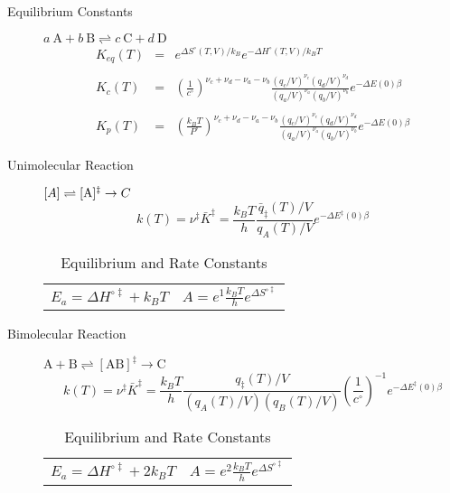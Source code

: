 \documentclass[11pt]{article}
\begin{document}
\begin{table}
\begin{center}
    \caption{\large{Equilibrium and Rate Constants}}
   \begin{description}
   \item[Equilibrium Constants] $a~\text{A} + b~\text{B} \rightleftharpoons c~\text{C} + d~\text{D} $
     \begin{eqnarray*}
       K_{eq}(T) &=& e^{\Delta S^\circ(T,V)/k_B}e^{-\Delta H^\circ(T,V)/k_BT}
       \\ \\
            K_c(T) &=&
           \left(\frac{1}{c^\circ}\right)^{\nu_c+\nu_d-\nu_a-\nu_b}\frac{(q_c/V)^{\nu_c}(q_d/V)^{\nu_d}}{(q_a/V)^{\nu_a}(q_b/V)^{\nu_b}}e^{-\Delta
            E(0)\beta}\\ \\
            K_p(T) &=&
          \left(\frac{k_BT}{P^\circ}\right)^{\nu_c+\nu_d-\nu_a-\nu_b}\frac{(q_c/V)^{\nu_c}(q_d/V)^{\nu_d}}{(q_a/V)^{\nu_a}(q_b/V)^{\nu_b}}e^{-\Delta
            E(0)\beta}
\end{eqnarray*}
\item[Unimolecular Reaction] $\text[A] \rightleftharpoons [\text{A} ]^\ddagger
  \rightarrow C$
      \begin{displaymath}
        k(T)=\nu^\ddagger \bar K^\ddagger=\frac{k_B T}{h} \frac{\bar{q}_\ddagger(T)/V}{q_A(T)/V}
          e^{-\Delta E^\ddagger(0)\beta}
      \end{displaymath}
\begin{center}
      \begin{tabular}{cc}
      $ \displaystyle E_a =\Delta H^{\circ\ddagger}+k_B T $
      & $ \displaystyle A = e^1\frac{k_B T}{h} e^{\Delta S^{\circ\ddagger}} $
      \end{tabular}
\end{center}
\item[Bimolecular Reaction] $
        \mathrm{A} + \mathrm{B} \rightleftharpoons [ \mathrm{AB}]^\ddagger
        \rightarrow \text{C}$
      \begin{displaymath}
        k(T)=\nu^\ddagger \bar K^\ddagger=\frac{k_B T}{h} \frac{q_\ddagger(T)/V}{(q_A(T)/V)(q_B(T)/V)}\left
          (\frac{1}{c^\circ}\right )^{-1}
        e^{-\Delta E^\ddagger(0)\beta}
      \end{displaymath}
      \begin{center}
        \begin{tabular}{cc}
        $ \displaystyle E_a  =\Delta H^{\circ\ddagger}+2 k_B T $ & $ \displaystyle
        A  = e^2\frac{k_B T}{h} e^{\Delta S^{\circ\ddagger}} $
      \end{tabular}
      \end{center}
   \end{description}
 \end{center}
 \end{table}
\end{document}
